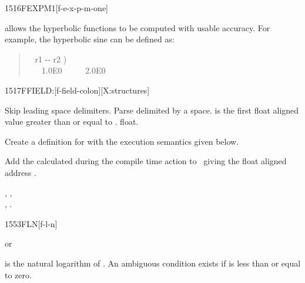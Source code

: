 \begin{worddef}{1516}{FEXPM1}[f-e-x-p-m-one]
\begin{rationale}
		  allows the hyperbolic functions to
		be computed with usable accuracy. For example, the hyperbolic
		sine can be defined as:

		\begin{quote}\ttfamily
			\word[core]{:} ~  r1 -{}- r2 ) \\
			\tab {}~ ~
				  1.0E0 \word{F+}~ ~ ~
				 2.0E0 
			\word[core]{;}
		\end{quote}
	\end{rationale}
\end{worddef}


\begin{worddef}{1517}{FFIELD:}[f-field-colon][X:structures]
\item {}

	Skip leading space delimiters. Parse  delimited by
	a space.  is the first float aligned value greater
	than or equal to .   float.

	Create a definition for  with the execution semantics
	given below.

\execute[name]
\cbstart{}
\cbend

	Add the  calculated during the compile time action to
\cbstart{}\cbend\ 
	giving the float aligned address
\cbstart{}.\cbend

\see {},
	, \\
	,
	.
\end{worddef}


\begin{worddef}{1553}{FLN}[f-l-n]
\item {} or

	 is the natural logarithm of . An ambiguous
	condition exists if \param{r_1} is less than or equal to zero.
\end{worddef}


